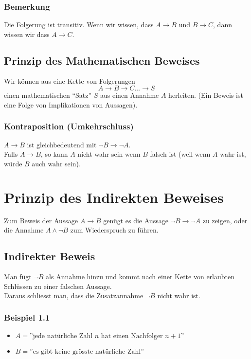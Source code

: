 \subsubsection*{Bemerkung}
Die Folgerung ist transitiv. Wenn wir wissen, dass $A\to B$ und $B\to C$, dann wissen wir dass $A\to C$.


\subsection*{Prinzip des Mathematischen Beweises}
Wir können aus eine Kette von Folgerungen \[A\to B \to C \dots \to S\]
einen mathematischen ``Satz'' $S$ aus einen Annahme $A$ herleiten. (Ein Beweis ist eine Folge von Implikationen von Aussagen). 
\subsubsection*{Kontraposition (Umkehrschluss)}

$A\to B$ ist gleichbedeutend mit $\lnot B\to\lnot A$.\\
Falls $A\to B$, so kann $A$ nicht wahr sein wenn $B$ falsch ist (weil wenn $A$ wahr ist, würde $B$ auch wahr sein).

\section{Prinzip des Indirekten Beweises}
Zum Beweis der Aussage $A\to B$ genügt es die Aussage $\lnot B\to\lnot A$ zu zeigen, oder die Annahme $A\land\lnot B$ zum Wiederspruch zu führen.

\subsection*{Indirekter Beweis}
Man fügt $\lnot B$ als Annahme hinzu und kommt nach einer Kette von erlaubten Schlüssen zu einer falschen Aussage.\\

\noindent Daraus schliesst man, dass die Zusatzannahme $\lnot B$ nicht wahr ist. 

\subsubsection*{Beispiel 1.1}
\begin{itemize}
\item $A=\text{''jede natürliche Zahl } n \text{ hat einen Nachfolger } n+1\text{''}$
\item $B=\text{''es gibt keine grösste natürliche Zahl''}$
\end{itemize}

